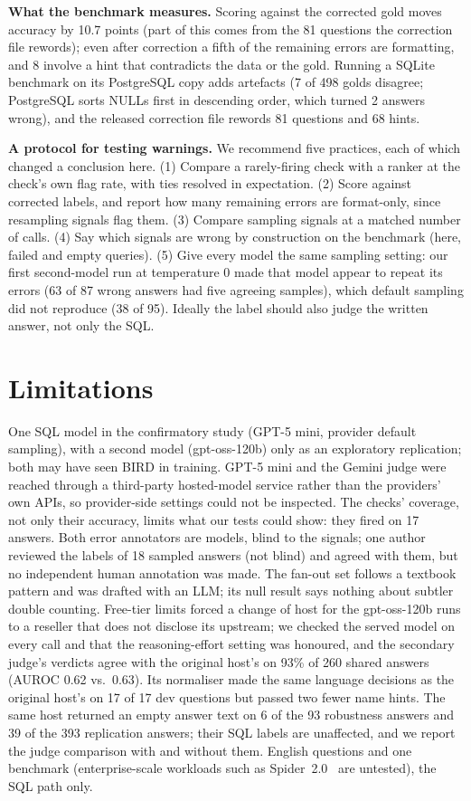 \documentclass[conference]{IEEEtran}
\begin{document}
\textbf{What the benchmark measures.} Scoring against the corrected gold moves accuracy by 10.7
points (part of this comes from the 81 questions the correction file rewords); even after
correction a fifth of the remaining errors are formatting, and 8 involve a hint that contradicts the
data or the gold. Running a SQLite benchmark on its PostgreSQL copy adds artefacts (7 of 498 golds
disagree; PostgreSQL sorts NULLs first in descending order, which turned 2 answers wrong), and the
released correction file rewords 81 questions and 68 hints. 

\textbf{A protocol for testing warnings.} We recommend five practices, each of which changed a
conclusion here. (1) Compare a rarely-firing check with a ranker at the check's own flag rate, with
ties resolved in expectation. (2) Score against corrected labels, and report how many remaining errors
are format-only, since resampling signals flag them. (3) Compare sampling signals at a matched number
of calls. (4) Say which signals are wrong by construction on the benchmark (here, failed and empty
queries). (5) Give every model the same sampling setting: our first second-model run at temperature 0
made that model appear to repeat its errors (63 of 87 wrong answers had five agreeing samples), which
default sampling did not reproduce (38 of 95). Ideally the label should also judge the written answer,
not only the SQL.

\section{Limitations}

One SQL model in the confirmatory study (GPT-5 mini, provider default sampling), with a second model
(gpt-oss-120b) only as an exploratory replication; both may have seen BIRD in training. GPT-5 mini and
the Gemini judge were reached through a third-party hosted-model service rather than the providers' own
APIs, so provider-side settings could not be inspected. The checks' coverage, not only their accuracy,
limits what our tests could show: they fired on 17 answers. Both error annotators are models, blind to the signals; one author reviewed the labels of 18 sampled
answers (not blind) and agreed with them, but no independent human annotation was made. The fan-out set follows a textbook pattern and was drafted with an LLM; its null result
says nothing about subtler double counting. Free-tier limits forced a change of host for the
gpt-oss-120b runs to a reseller that does not disclose its upstream; we checked the served model on
every call and that the reasoning-effort setting was honoured, and the secondary judge's verdicts
agree with the original host's on 93\% of 260 shared answers (AUROC 0.62 vs.\ 0.63). Its normaliser made the same language decisions as the original host's on 17 of 17 dev questions but passed two
fewer name hints. The same host returned an empty answer text on 6 of the 93 robustness answers and 39 of the 393 replication answers; their SQL labels are unaffected, and
we report the judge comparison with and without them. English questions and one benchmark (enterprise-scale workloads such as Spider~2.0~\cite{lei2025spider2} are untested), the SQL path
only.
\end{document}

